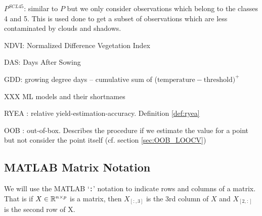 $P^{SCL45}$: similar to $P$ but we only consider observations which belong to the classes 4 and 5. This is used done to get a subset of observations which are less contaminated by clouds and shadows.

NDVI: Normalized Difference Vegetation Index \citep{rouseMonitoringVernalAdvancement1974}

DAS: Days After Sowing

GDD: growing degree days -- cumulative sum of ($\text{temperature}-\text{threshold})^+$

XXX ML models and their shortnames

RYEA : relative yield-estimation-accuracy. Definition \ref{def:ryea}

OOB : out-of-box. Describes the procedure if we estimate the value for a point but not consider the point itself (cf. section \ref{sec:OOB_LOOCV})


\subsection*{MATLAB Matrix Notation}{ \label{sec:MATLAB}
		We will use the MATLAB `\texttt{:}' notation to indicate rows and columns of a matrix. That is if $X\in\mathbb{R}^{n\times p}$ is a matrix, then $X_{[:,3]}$ is the $3$rd column of $X$ and $X_{[2,:]}$ is the second row of X. 
}


